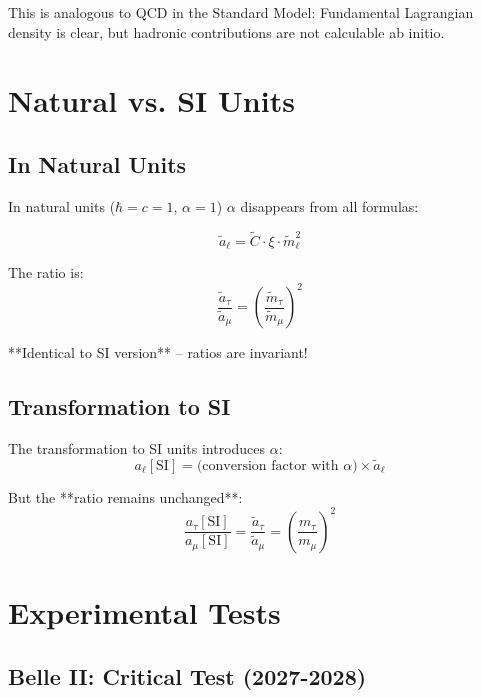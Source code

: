 	This is analogous to QCD in the Standard Model: Fundamental Lagrangian density is clear, 
	but hadronic contributions are not calculable ab initio.
	
	\section{Natural vs. SI Units}
	
	\subsection{In Natural Units}
	
	In natural units ($\hbar = c = 1$, $\alpha = 1$) $\alpha$ disappears from all formulas:
	
	\begin{equation}
		\tilde{a}_\ell = \tilde{C} \cdot \xi \cdot \tilde{m}_\ell^2
		\label{eq:natural_units}
	\end{equation}
	
	The ratio is:
	\begin{equation}
		\frac{\tilde{a}_\tau}{\tilde{a}_\mu} = \left(\frac{\tilde{m}_\tau}{\tilde{m}_\mu}\right)^2
	\end{equation}
	
	**Identical to SI version** – ratios are invariant!
	
	\subsection{Transformation to SI}
	
	The transformation to SI units introduces $\alpha$:
	\begin{equation}
		a_\ell[\text{SI}] = \text{(conversion factor with } \alpha\text{)} \times \tilde{a}_\ell
	\end{equation}
	
	But the **ratio remains unchanged**:
	\begin{equation}
		\frac{a_\tau[\text{SI}]}{a_\mu[\text{SI}]} = \frac{\tilde{a}_\tau}{\tilde{a}_\mu} = 
		\left(\frac{m_\tau}{m_\mu}\right)^2
	\end{equation}
	
	\section{Experimental Tests}
	
	\subsection{Belle II: Critical Test (2027-2028)}
	
